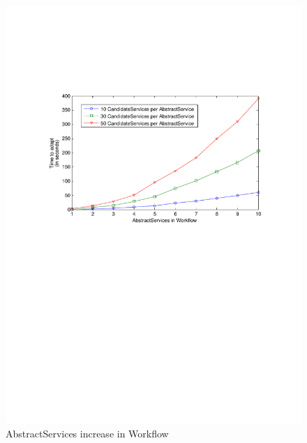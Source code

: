 \documentclass[10pt,journal,compsoc]{IEEEtran}
\begin{document}
\begin{figure}[htbp]
      \centering
	\includegraphics[clip, trim=2cm 14cm 2cm 6cm, scale=0.42]{graphs/10_30_50_svc_per_task_scaling.pdf}
	\caption{AbstractServices increase in Workflow\label{fig:svc_per_task}}
\end{figure}
\end{document}
